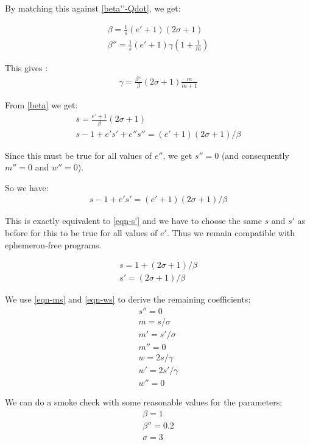 \documentclass{article}
\begin{document}
By matching this against \eqref{beta''-Qdot}, we get:

\begin{gather}
\beta = \frac{1}{\overline{s}}(e'+1)(2\sigma+1)    \label{beta}\\
\beta'' = \frac{1}{\overline{s}}(e'+1)\gamma(1+\frac{1}{m})   \label{beta''}
\end{gather}

This gives :
\begin{gather}
\gamma = \frac{\beta''}{\beta}(2\sigma+1)\frac{m}{m+1} \label{eqn-gamma}
\end{gather}

From \eqref{beta} we get:
\begin{gather}
\overline{s} = \frac{e'+1}{\beta}(2\sigma+1) \\
s - 1 + e's' + e''s'' = (e'+1)(2\sigma+1)/\beta
\end{gather}

Since this must be true for all values of $e''$, we get $s'' = 0$ (and
consequently $m'' = 0$ and $w'' = 0$).

So we have:
\begin{gather}
s - 1 + e's' = (e'+1)(2\sigma+1)/\beta
\end{gather}

This is exactly equivalent to \eqref{eqn-s'} and we
have to choose the same $s$ and $s'$ as before for this to be true for
all values of $e'$. Thus we remain compatible with
ephemeron-free programs.

\begin{gather}
s = 1 + (2\sigma + 1)/\beta \\
s' = (2\sigma + 1)/\beta
\end{gather}

We use \eqref{eqn-ms} and \eqref{eqn-ws} to derive the remaining
coefficients:
\begin{gather}
s'' = 0 \\
m = s/\sigma \\
m' = s'/\sigma \\
m'' = 0 \\
w = 2s/\gamma \\
w' = 2s'/\gamma \\
w'' = 0
\end{gather}

We can do a smoke check with some reasonable values for the
parameters:
\begin{gather}
\beta = 1 \\
\beta'' = 0.2 \\
\sigma = 3
\end{gather}
\end{document}
